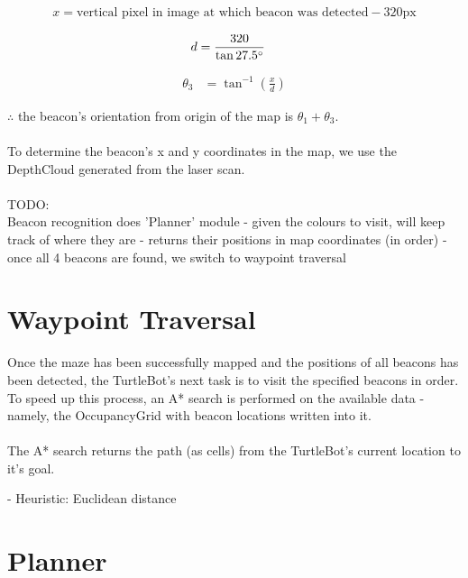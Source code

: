 \documentclass[titlepage,12pt,a4paper]{article}
\begin{document}
\begin{equation*}
	\begin{split}
		x = \mbox{vertical pixel in image at which beacon was detected} - 320\mbox{px}
	\end{split}
\end{equation*}

\begin{equation*}
	\begin{split}
		d &= \frac{320}{\tan{27.5\degree}}
	\end{split}
\end{equation*}

\begin{equation*}
	\begin{split}
		\theta_3 &= \tan^{-1}{(\frac{x}{d})}
	\end{split}
\end{equation*}

$\therefore$ the beacon's orientation from origin of the map is $\theta_1 + \theta_3$. \\
\\
To determine the beacon's x and y coordinates in the map, we use the DepthCloud generated from the laser scan. \\
\\
TODO:\\
Beacon recognition does 'Planner' module
	- given the colours to visit, will keep track of where they are
	- returns their positions in map coordinates (in order)
	- once all 4 beacons are found, we switch to waypoint traversal


\section*{Waypoint Traversal}

Once the maze has been successfully mapped and the positions of all beacons has been detected, the TurtleBot's next task is to visit the specified beacons in order. To speed up this process, an A* search is performed on the available data - namely, the OccupancyGrid with beacon locations written into it.\\
\\
The A* search returns the path (as cells) from the TurtleBot's current location to it's goal.

- Heuristic: Euclidean distance

\section*{Planner}
\end{document}
